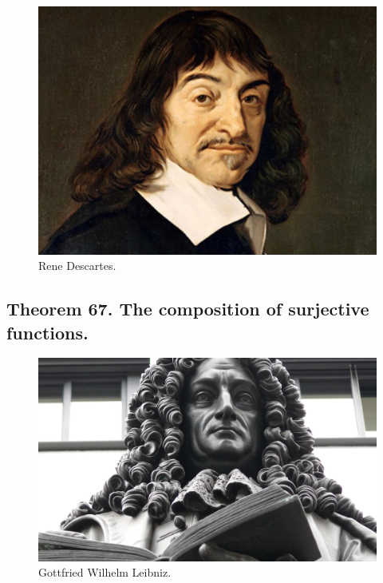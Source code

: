 \documentclass[preview]{standalone}
\begin{document}
\begin{figure}[!h]
    \centering
    \includegraphics[width=14cm]{../resources/jpg/2.3.functions/descartes.jpg}
    \caption*{Rene Descartes.}
\end{figure}
\subsection[The composition of surjective functions is surjective.]
    {
        \color{section}Theorem 67. \color{black} The composition of surjective functions.
    }

\pagebreak


\begin{figure}[!h]
    \centering
    \includegraphics[width=14cm]{../resources/jpg/2.3.functions/leibniz.jpg}
    \caption*{Gottfried Wilhelm Leibniz.}
\end{figure}
\end{document}
